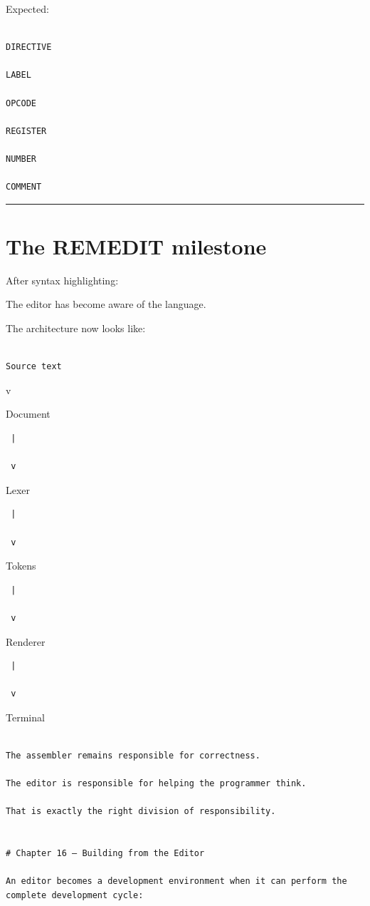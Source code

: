 \documentclass[
  oneside,
  openany]{book}
\begin{document}
Expected:

\begin{verbatim}

DIRECTIVE

LABEL

OPCODE

REGISTER

NUMBER

COMMENT
\end{verbatim}

\begin{center}\rule{0.5\linewidth}{0.5pt}\end{center}

\hypertarget{the-remedit-milestone}{%
\section{The REMEDIT milestone}\label{the-remedit-milestone}}

After syntax highlighting:

The editor has become aware of the language.

The architecture now looks like:

\begin{verbatim}

Source text
\end{verbatim}

\textbar{}

v 

Document

\begin{verbatim}
 |

 v
\end{verbatim}

Lexer

\begin{verbatim}
 |

 v
\end{verbatim}

Tokens

\begin{verbatim}
 |

 v
\end{verbatim}

Renderer

\begin{verbatim}
 |

 v
\end{verbatim}

Terminal

\begin{verbatim}

The assembler remains responsible for correctness.

The editor is responsible for helping the programmer think.

That is exactly the right division of responsibility.


# Chapter 16 — Building from the Editor

An editor becomes a development environment when it can perform the complete development cycle:
\end{verbatim}
\end{document}
